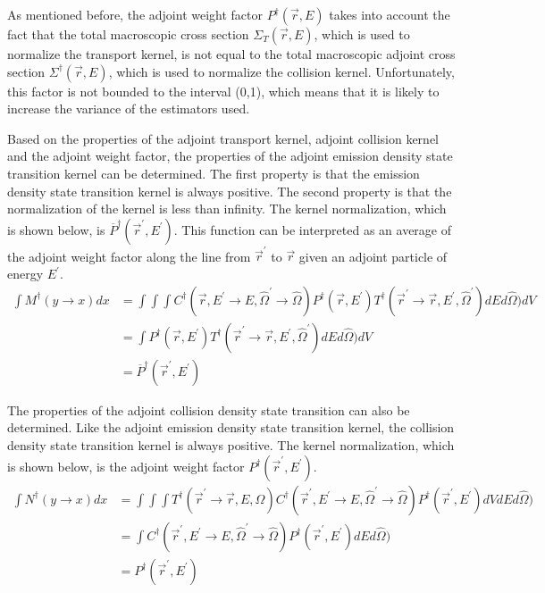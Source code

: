 As mentioned before, the adjoint weight factor $P^{\dagger}(\vec{r},E)$ takes 
into account the fact that the total macroscopic cross section 
$\Sigma_T(\vec{r},E)$, which is used to normalize the transport kernel, is not 
equal to the total macroscopic adjoint cross section 
$\Sigma^{\dagger}(\vec{r},E)$, which is used to normalize the collision kernel. 
Unfortunately, this factor is not bounded to the interval (0,1), which means
that it is likely to increase the variance of the estimators used. 

Based on the properties of the adjoint transport kernel, adjoint collision
kernel and the adjoint weight factor, the properties of the adjoint emission
density state transition kernel can be determined. The first property is that
the emission density state transition kernel is always positive. The second
property is that the normalization of the kernel is less than infinity. The
kernel normalization, which is shown below, is 
$\overline{P}^{\dagger}(\vec{r}^{'},E^{'})$. This function can be interpreted as
an average of the adjoint weight factor along the line from $\vec{r}^{'}$ to
$\vec{r}$ given an adjoint particle of energy $E^{'}$.
\begin{align}
  \int M^{\dagger}(y \to x)dx & = \int\int\int 
  C^{\dagger}(\vec{r},E^{'} \to E,\hat{\Omega}^{'} \to \hat{\Omega})
  P^{\dagger}(\vec{r},E^{'}) 
  T^{\dagger}(\vec{r}^{'} \to \vec{r},E^{'},\hat{\Omega}^{'}) dE d\hat{\Omega}) dV
  \nonumber \\
  & = \int P^{\dagger}(\vec{r},E^{'})
  T^{\dagger}(\vec{r}^{'} \to \vec{r},E^{'},\hat{\Omega}^{'}) dE d\hat{\Omega}) dV
  \nonumber \\
  & = \overline{P}^{\dagger}(\vec{r}^{'},E^{'}) 
\end{align}

The properties of the adjoint collision density state transition can also be
determined. Like the adjoint emission density state transition kernel, the 
collision density state transition kernel is always positive. The kernel
normalization, which is shown below, is the adjoint weight factor 
$P^{\dagger}(\vec{r}^{'},E^{'})$. 
\begin{align}
  \int N^{\dagger}(y \to x)dx & = \int\int\int
  T^{\dagger}(\vec{r}^{'} \to \vec{r},E,\hat{\Omega})
  C^{\dagger}(\vec{r}^{'},E^{'} \to E,\hat{\Omega}^{'} \to \hat{\Omega})
  P^{\dagger}(\vec{r}^{'},E^{'}) dV dE d\hat{\Omega}) 
  \nonumber \\
  & = \int C^{\dagger}(\vec{r}^{'},E^{'} \to E,\hat{\Omega}^{'} \to \hat{\Omega})
  P^{\dagger}(\vec{r}^{'},E^{'}) dE d\hat{\Omega})
  \nonumber \\
  & = P^{\dagger}(\vec{r}^{'},E^{'}) 
\end{align}

